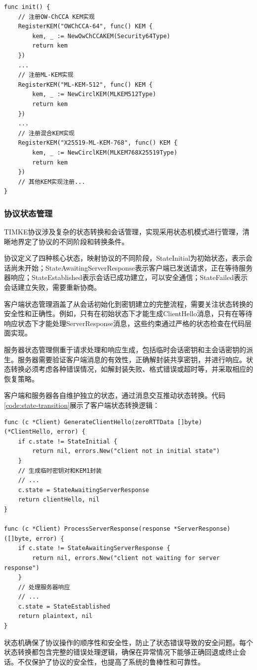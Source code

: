 \begin{listing}[ht]
\begin{verbatim}
func init() {
    // 注册OW-ChCCA KEM实现
    RegisterKEM("OWChCCA-64", func() KEM {
        kem, _ := NewOwChCCAKEM(Security64Type)
        return kem
    })
    ...
    // 注册ML-KEM实现
    RegisterKEM("ML-KEM-512", func() KEM {
        kem, _ := NewCirclKEM(MLKEM512Type)
        return kem
    })
    ...
    // 注册混合KEM实现
    RegisterKEM("X25519-ML-KEM-768", func() KEM {
        kem, _ := NewCirclKEM(MLKEM768X25519Type)
        return kem
    })
    // 其他KEM实现注册...
}
\end{verbatim}
\caption{KEM注册代码}
\label{code:kem-registry}
\end{listing}

\subsubsection{协议状态管理}
\label{subsubsec:state_management}

TIMKE协议涉及复杂的状态转换和会话管理，实现采用状态机模式进行管理，清晰地界定了协议的不同阶段和转换条件。

协议定义了四种核心状态，映射协议的不同阶段，StateInitial为初始状态，表示会话尚未开始；StateAwaitingServerResponse表示客户端已发送请求，正在等待服务器响应；StateEstablished表示会话已成功建立，可以安全通信；StateFailed表示会话建立失败，需要重新协商。

客户端状态管理涵盖了从会话初始化到密钥建立的完整流程，需要关注状态转换的安全性和正确性。例如，只有在初始状态下才能生成ClientHello消息，只有在等待响应状态下才能处理ServerResponse消息，这些约束通过严格的状态检查在代码层面实现。

服务器状态管理侧重于请求处理和响应生成，包括临时会话密钥和主会话密钥的派生。服务器需要验证客户端消息的有效性，正确解封装共享密钥，并进行响应。状态转换必须考虑各种错误情况，如解封装失败、格式错误或超时等，并采取相应的恢复策略。

客户端和服务器各自维护独立的状态，通过消息交互推动状态转换。代码\ref{code:state-transition}展示了客户端状态转换逻辑：

\begin{listing}[ht]
\begin{verbatim}
func (c *Client) GenerateClientHello(zeroRTTData []byte) (*ClientHello, error) {
    if c.state != StateInitial {
        return nil, errors.New("client not in initial state")
    }
    // 生成临时密钥对和KEM1封装
    // ...
    c.state = StateAwaitingServerResponse
    return clientHello, nil
}

func (c *Client) ProcessServerResponse(response *ServerResponse) ([]byte, error) {
    if c.state != StateAwaitingServerResponse {
        return nil, errors.New("client not waiting for server response")
    }
    // 处理服务器响应
    // ...
    c.state = StateEstablished
    return plaintext, nil
}
\end{verbatim}
\caption{客户端状态转换代码}
\label{code:state-transition}
\end{listing}
状态机确保了协议操作的顺序性和安全性，防止了状态错误导致的安全问题。每个状态转换都包含完整的错误处理逻辑，确保在异常情况下能够正确回退或终止会话。不仅保护了协议的安全性，也提高了系统的鲁棒性和可靠性。

